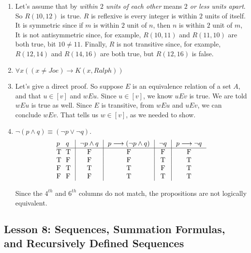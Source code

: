 \documentclass[11pt]{amsart}
\begin{document}
\begin{enumerate}
\item Let's assume that by {\it within $2$ units of each other} means {\it $2$ or less units apart}. So $R(10,12)$ 
is true.  $R$ is reflexive is every integer is within $2$ units of itself. It is symmetric since if $m$ is within $2$ unit of 
$n$, then $n$ is within $2$ unit of $m$, It is not antisymmetric since, for example, $R(10,11)$ and 
$R(11,10)$ are both true, bit $10\not=11$. Finally,  $R$ is not transitive since, for example, $R(12,14)$ and 
$R(14,16)$ are both true, but $R(12,16)$ is false.

\medskip


\item  $\forall{x}( (x\not= Joe) \longrightarrow K(x,Ralph))$

\medskip


\item  Let's give a direct proof. So suppose  $E$ is an equivalence relation of a set $A$, and  that $u\in [v]$ and $wEu$. Since $u\in [v]$, we know $uEv$ is true. We are told $wEu$ is true as well. Since $E$ is transitive, from $wEu$ and $uEv$, we can conclude $wEv$. That tells us $w\in [v]$, as we needed to show.

\medskip


\item {} $\neg(p\wedge q)\equiv (\neg p \vee \neg q)$.
$$\vbox{\offinterlineskip
\halign { \strut # & # & \vrule ~~# & \vrule ~~# & \vrule ~~# & \vrule ~~# \cr
$p$ & $q$ & $\neg p\land q$ & $p\longrightarrow(\neg p\land q)$  & $\neg q$ & $p \longrightarrow\neg q$ \cr
\noalign{\hrule}
T   &  T   &  F  &  F & F & F  \cr
T   &  F   &  F  &  F & T & T  \cr
F   &  T   &  T  &  T & F & T  \cr
F   &  F   &  F  &  T & T & T  \cr
}}$$

Since the $4^{th}$ and $6^{th}$ columns do not match, the propositions are not logically equivalent.

\end{enumerate}

\subsection{Lesson 8: Sequences, Summation Formulas, and Recursively Defined Sequences}
\end{document}
